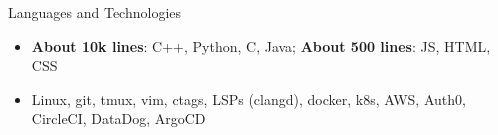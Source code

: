 \documentclass[]{mcdowellcv}
\begin{document}
    \begin{cvsection}{Languages and Technologies}
        \begin{cvsubsection}{}{}{}
            \begin{itemize}
                \item \textbf{About 10k lines}: C++, Python, C, Java; \textbf{About 500 lines}: JS, HTML, CSS
                \item Linux, git, tmux, vim, ctags, LSPs (clangd), docker, k8s, AWS, Auth0, CircleCI, DataDog, ArgoCD
            \end{itemize}
        \end{cvsubsection}
    \end{cvsection}
\end{document}
